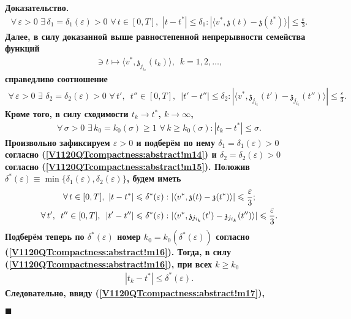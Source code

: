 \documentclass{report}
\newenvironment{Proof}{\par\noindent\bf Доказательство.\rm}{ $\blacksquare$\par}
\begin{document}
\begin{Proof}
\begin{gather}\label{V1120QTcompactness:abstract!m14}
\forall\,\varepsilon>0\,\,\exists\,\delta_1=\delta_1(\varepsilon)>0\,\,\forall\,t\in[0,T],\,\,|t-t^*|\leqslant\delta_1:|\langle v^*,\mathfrak{z}(t)-\mathfrak{z}(t^*)\rangle|\leqslant
\frac\varepsilon3.
\end{gather}
Далее, в силу доказанной выше равностепенной непрерывности семейства функций
\begin{gather*}
[0,T]\ni t\mapsto\langle v^*,\mathfrak{z}_{j_{i_k}}(t_k)\rangle,\,\,\,k=1,2,\dots,
\end{gather*}
справедливо соотношение
\begin{gather}\label{V1120QTcompactness:abstract!m15}
\forall\,\varepsilon>0\,\,\exists\,\,\delta_2=\delta_2(\varepsilon)>0\,\,\forall\,t',\,\,\,t''\in[0,T],\,\,\,|t'-t''|\leqslant\delta_2:
|\langle v^*,\mathfrak{z}_{j_{i_k}}(t')-\mathfrak{z}_{j_{i_k}}(t'')\rangle|\leqslant\frac\varepsilon3.
\end{gather}
Кроме того, в силу сходимости $t_k\to t^*$, $k\to\infty$,
\begin{gather}\label{V1120QTcompactness:abstract!m16}
\forall\,\sigma>0\,\,\exists\,k_0=k_0(\sigma)\geqslant1\,\,\forall\,k\geqslant k_0(\sigma):|t_k-t^*|\leqslant\sigma.
\end{gather}
Произвольно зафиксируем $\varepsilon>0$ и подберём по нему $\delta_1=\delta_1(\varepsilon)>0$ согласно (\ref{V1120QTcompactness:abstract!m14}) и $\delta_2=\delta_2(\varepsilon)>0$ согласно
(\ref{V1120QTcompactness:abstract!m15}). Положив $\delta^*(\varepsilon)\equiv\min\{\delta_1(\varepsilon),\delta_2(\varepsilon)\}$, будем иметь
\begin{gather}\label{V1120QTcompactness:abstract!m17}
\forall\,t\in[0,T],\,\,|t-t^*|\leqslant\delta^*(\varepsilon):|\langle v^*,\mathfrak{z}(t)-\mathfrak{z}(t^*)\rangle|\leqslant\frac\varepsilon3;\\
\notag\forall\,t',\,\,\,t''\in[0,T],\,\,\,|t'-t''|\leqslant\delta^*(\varepsilon):|\langle v^*,\mathfrak{z}_{j_{i_k}}(t')-\mathfrak{z}_{j_{i_k}}(t'')\rangle|\leqslant\frac\varepsilon3.
\end{gather}
Подберём теперь по $\delta^*(\varepsilon)$ номер $k_0=k_0(\delta^*(\varepsilon))$ согласно (\ref{V1120QTcompactness:abstract!m16}). Тогда, в силу (\ref{V1120QTcompactness:abstract!m16}),
при всех $k\geqslant k_0$
\begin{gather*}
|t_k-t^*|\leqslant\delta^*(\varepsilon).
\end{gather*}
Следовательно, ввиду (\ref{V1120QTcompactness:abstract!m17}),

\end{Proof}
\end{document}
